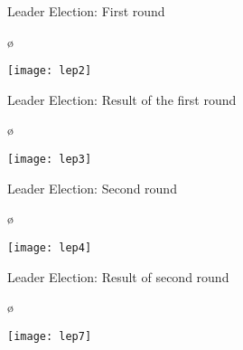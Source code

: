 \documentclass{beamer}
\begin{document}

\begin{frame}{Leader Election: First round}

\o \centerline{\texttt{[image: lep2]}}

\end{frame}


\begin{frame}{Leader Election: Result of the first round}

\o \centerline{\texttt{[image: lep3]}}

\end{frame}


\begin{frame}{Leader Election: Second round}

\o \centerline{\texttt{[image: lep4]}}

\end{frame}


\begin{frame}{Leader Election: Result of second round}

\o \centerline{\texttt{[image: lep7]}}

\end{frame}

\end{document}
